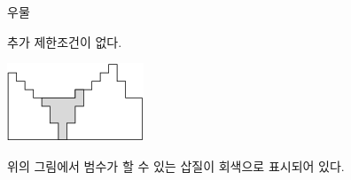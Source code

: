 \begin{problem}{우물}
	
	추가 제한조건이 없다.
	
	\Examples
		
	\begin{example}
	\end{example}
	
	\Note
	
	\begin{center}
	\includegraphics[]{stu.png}
	\end{center}
	
	위의 그림에서 범수가 할 수 있는 삽질이 회색으로 표시되어 있다.
	
        
\end{problem}

